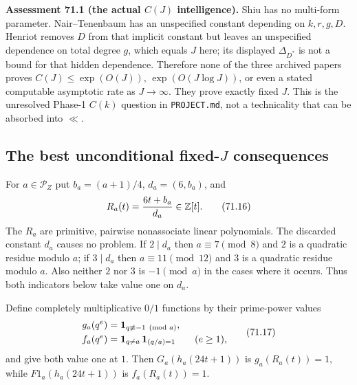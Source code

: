\documentclass[10pt,reqno]{amsart}
\theoremstyle{definition}
\newcommand{\1}{\mathbf 1}
\begin{document}
\medskip\noindent\textbf{Assessment 71.1 (the actual $C(J)$ intelligence).}  Shiu has no
multi-form parameter.  Nair--Tenenbaum has an unspecified constant depending
on $k,r,g,D$.  Henriot removes $D$ from that implicit constant but leaves
an unspecified dependence on total degree $g$, which equals $J$ here;
its displayed $\Delta_{D^*}$ is not a bound for that hidden dependence.
Therefore none of the three archived papers proves
$C(J)\leq\exp(O(J))$, $\exp(O(J\log J))$, or even a stated
computable asymptotic rate as $J\to\infty$.  They prove exactly fixed
$J$.  This is the unresolved Phase-1 $C(k)$ question in
\texttt{PROJECT.md}, not a technicality that can be absorbed into $\ll$.

\subsection{The best unconditional fixed-$J$ consequences}

For $a\in\mathcal P_Z$ put $b_a=(a+1)/4$,
$d_a=(6,b_a)$, and
\begin{equation}
                  R_a(t)={6t+b_a\over d_a}\in\mathbb Z[t]. \tag{71.16}
\end{equation}
The $R_a$ are primitive, pairwise nonassociate linear polynomials.
The discarded constant $d_a$ causes no problem.  If $2\mid d_a$ then
$a\equiv7\pmod8$ and $2$ is a quadratic residue modulo $a$; if
$3\mid d_a$ then $a\equiv11\pmod {12}$ and $3$ is a quadratic
residue modulo $a$.  Also neither $2$ nor $3$ is $-1\pmod a$
in the cases where it occurs.  Thus both indicators below take value one on
$d_a$.

Define completely multiplicative $0/1$ functions by their prime-power
values
\begin{equation}
 \begin{split}
 g_a(q^e)&={\bf1}_{q\not\equiv-1\pmod a},\\
 f_a(q^e)&={\bf1}_{q\ne a}\,{\bf1}_{(q/a)=1}
       \qquad(e\geq1),
 \end{split}                                               \tag{71.17}
\end{equation}
and give both value one at $1$.  Then $G_a(h_a(24t+1))$ is
$g_a(R_a(t))=1$, while $F1_a(h_a(24t+1))$ is
$f_a(R_a(t))=1$.
\end{document}
